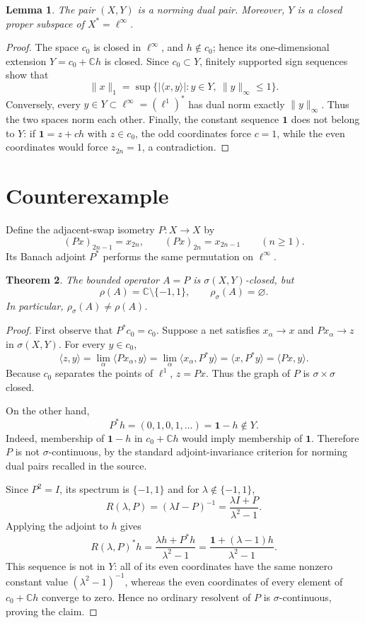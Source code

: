 \documentclass[11pt]{article}
\newtheorem{theorem}{Theorem}
\newtheorem{lemma}[theorem]{Lemma}
\begin{document}
\begin{lemma}\label{lem:dualpair}
The pair $(X,Y)$ is a norming dual pair.  Moreover, $Y$ is a closed proper
subspace of $X^*=\ell^\infty$.
\end{lemma}

\begin{proof}
The space $c_0$ is closed in $\ell^\infty$, and $h\notin c_0$; hence its
one-dimensional extension $Y=c_0+\mathbb Ch$ is closed.  Since $c_0\subset
Y$, finitely supported sign sequences show that
\[
 \|x\|_1=\sup\{ |\langle x,y\rangle|:y\in Y,\ \|y\|_\infty\leq1\}.
\]
Conversely, every $y\in Y\subset\ell^\infty=(\ell^1)^*$ has dual norm
exactly $\|y\|_\infty$.  Thus the two spaces norm each other.  Finally, the
constant sequence $\mathbf1$ does not belong to $Y$: if
$\mathbf1=z+ch$ with $z\in c_0$, the odd coordinates force $c=1$, while the
even coordinates would force $z_{2n}=1$, a contradiction.
\end{proof}

\section{Counterexample}

Define the adjacent-swap isometry $P:X\to X$ by
\[
 (Px)_{2n-1}=x_{2n},\qquad (Px)_{2n}=x_{2n-1}\qquad(n\geq1).
\]
Its Banach adjoint $P^*$ performs the same permutation on $\ell^\infty$.

\begin{theorem}\label{thm:counterexample}
The bounded operator $A=P$ is $\sigma(X,Y)$-closed, but
\[
 \rho(A)=\mathbb C\setminus\{-1,1\},
 \qquad \rho_\sigma(A)=\varnothing.
\]
In particular, $\rho_\sigma(A)\neq\rho(A)$.
\end{theorem}

\begin{proof}
First observe that $P^*c_0=c_0$.  Suppose a net satisfies
$x_\alpha\to x$ and $Px_\alpha\to z$ in $\sigma(X,Y)$.  For every
$y\in c_0$,
\[
 \langle z,y\rangle
 =\lim_\alpha\langle Px_\alpha,y\rangle
 =\lim_\alpha\langle x_\alpha,P^*y\rangle
 =\langle x,P^*y\rangle
 =\langle Px,y\rangle.
\]
Because $c_0$ separates the points of $\ell^1$, $z=Px$.  Thus the graph of
$P$ is $\sigma\times\sigma$ closed.

On the other hand,
\[
 P^*h=(0,1,0,1,\ldots)=\mathbf1-h\notin Y.
\]
Indeed, membership of $\mathbf1-h$ in $c_0+\mathbb Ch$ would imply
membership of $\mathbf1$.  Therefore $P$ is not $\sigma$-continuous, by the
standard adjoint-invariance criterion for norming dual pairs recalled in the
source.

Since $P^2=I$, its spectrum is $\{-1,1\}$ and for
$\lambda\notin\{-1,1\}$,
\[
 R(\lambda,P)=(\lambda I-P)^{-1}
 =\frac{\lambda I+P}{\lambda^2-1}.
\]
Applying the adjoint to $h$ gives
\[
 R(\lambda,P)^*h
 =\frac{\lambda h+P^*h}{\lambda^2-1}
 =\frac{\mathbf1+(\lambda-1)h}{\lambda^2-1}.
\]
This sequence is not in $Y$: all of its even coordinates have the same
nonzero constant value $(\lambda^2-1)^{-1}$, whereas the even coordinates of
every element of $c_0+\mathbb Ch$ converge to zero.  Hence no ordinary
resolvent of $P$ is $\sigma$-continuous, proving the claim.
\end{proof}
\end{document}
